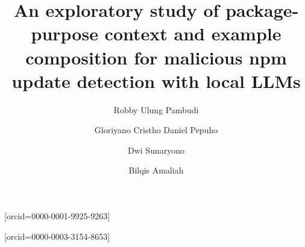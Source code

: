 \documentclass[a4paper,fleqn]{cas-dc}
\begin{document}
\let\WriteBookmarks\relax
\def\floatpagepagefraction{1}
\def\textpagefraction{.001}
\title[mode=title]{An exploratory study of package-purpose context and example composition for malicious npm update detection with local LLMs}

\author[1]{Robby Ulung Pambudi}

\author[1]{Gloriyano Cristho Daniel Pepuho}

\author[1]{Dwi Sunaryono}[orcid=0000-0001-9925-9263]
\cormark[1]

\author[1]{Bilqis Amaliah}[orcid=0000-0003-3154-8653]


\end{document}
